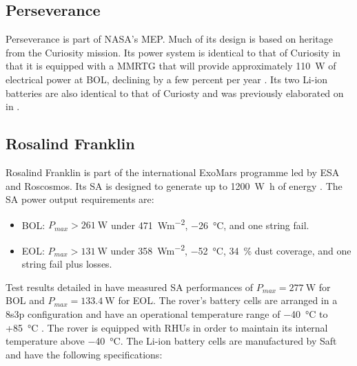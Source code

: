 \subsection{Perseverance}
\label{sec:StateOfTheArt:PlannedMissions:Mars2020}

Perseverance is part of \ac{NASA}'s \ac{MEP}. Much of its design is based on heritage from the Curiosity mission. Its power system is identical to that of Curiosity in that it is equipped with a \ac{MMRTG} that will provide approximately \SI{110}{\watt} of electrical power at \ac{BOL}, declining by a few percent per year . Its two \ac{Li-ion} batteries are also identical to that of Curiosty and was previously elaborated on in .

\subsection{Rosalind Franklin}
\label{sec:StateOfTheArt:PlannedMissions:RosalindFranklin}

Rosalind Franklin is part of the international ExoMars programme led by \ac{ESA} and Roscosmos. Its \ac{SA} is designed to generate up to \SI{1200}{\watt\hour} of energy . The \ac{SA} power output requirements are:

\begin{itemize}
    \item \ac{BOL}: $P_{max} > \SI{261}{\watt}$ under \SI{471}{Wm^{-2}}, \SI{-26}{\celsius}, and one string fail.
    \item \ac{EOL}: $P_{max} > \SI{131}{\watt}$ under \SI{358}{Wm^{-2}}, \SI{-52}{\celsius}, \SI{34}{\percent} dust coverage, and one string fail plus losses.
\end{itemize}

Test results detailed in  have measured \ac{SA} performances of $P_{max} = \SI{277}{\watt}$ for \ac{BOL} and $P_{max} = \SI{133.4}{\watt}$ for \ac{EOL}. The rover's battery cells are arranged in a 8s3p configuration and have an operational temperature range of \SI{-40}{\celsius} to +\SI{85}{\celsius} . The rover is equipped with \acp{RHU} in order to maintain its internal temperature above \SI{-40}{\celsius}. The \ac{Li-ion} battery cells are manufactured by Saft and have the following specifications:


